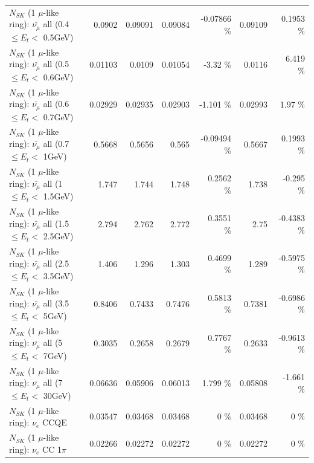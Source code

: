\begin{table}
\begin{tabular}{| l | r | r | r  r | r  r |}
 $N_{SK}$ (1 $\mu$-like ring): $\bar{\nu_{\mu}}$ all (0.4 $\leq E_{t} <$ 0.5GeV) &          0.0902 &         0.09091 &         0.09084 & -0.07866 \%  &         0.09109 &   0.1953 \%  \\ 
 $N_{SK}$ (1 $\mu$-like ring): $\bar{\nu_{\mu}}$ all (0.5 $\leq E_{t} <$ 0.6GeV) &         0.01103 &          0.0109 &         0.01054 &    -3.32 \%  &          0.0116 &    6.419 \%  \\ 
 $N_{SK}$ (1 $\mu$-like ring): $\bar{\nu_{\mu}}$ all (0.6 $\leq E_{t} <$ 0.7GeV) &         0.02929 &         0.02935 &         0.02903 &   -1.101 \%  &         0.02993 &     1.97 \%  \\ 
   $N_{SK}$ (1 $\mu$-like ring): $\bar{\nu_{\mu}}$ all (0.7 $\leq E_{t} <$ 1GeV) &          0.5668 &          0.5656 &           0.565 & -0.09494 \%  &          0.5667 &   0.1993 \%  \\ 
   $N_{SK}$ (1 $\mu$-like ring): $\bar{\nu_{\mu}}$ all (1 $\leq E_{t} <$ 1.5GeV) &           1.747 &           1.744 &           1.748 &   0.2562 \%  &           1.738 &   -0.295 \%  \\ 
 $N_{SK}$ (1 $\mu$-like ring): $\bar{\nu_{\mu}}$ all (1.5 $\leq E_{t} <$ 2.5GeV) &           2.794 &           2.762 &           2.772 &   0.3551 \%  &            2.75 &  -0.4383 \%  \\ 
 $N_{SK}$ (1 $\mu$-like ring): $\bar{\nu_{\mu}}$ all (2.5 $\leq E_{t} <$ 3.5GeV) &           1.406 &           1.296 &           1.303 &   0.4699 \%  &           1.289 &  -0.5975 \%  \\ 
   $N_{SK}$ (1 $\mu$-like ring): $\bar{\nu_{\mu}}$ all (3.5 $\leq E_{t} <$ 5GeV) &          0.8406 &          0.7433 &          0.7476 &   0.5813 \%  &          0.7381 &  -0.6986 \%  \\ 
     $N_{SK}$ (1 $\mu$-like ring): $\bar{\nu_{\mu}}$ all (5 $\leq E_{t} <$ 7GeV) &          0.3035 &          0.2658 &          0.2679 &   0.7767 \%  &          0.2633 &  -0.9613 \%  \\ 
    $N_{SK}$ (1 $\mu$-like ring): $\bar{\nu_{\mu}}$ all (7 $\leq E_{t} <$ 30GeV) &         0.06636 &         0.05906 &         0.06013 &    1.799 \%  &         0.05808 &   -1.661 \%  \\ 
\hline
\hline
\hline
                                      $N_{SK}$ (1 $\mu$-like ring): $\nu_e$ CCQE &         0.03547 &         0.03468 &         0.03468 &        0 \%  &         0.03468 &        0 \%  \\ 
                                 $N_{SK}$ (1 $\mu$-like ring): $\nu_e$ CC 1$\pi$ &         0.02266 &         0.02272 &         0.02272 &        0 \%  &         0.02272 &        0 \%  \\ 

\end{tabular}
\end{table}
